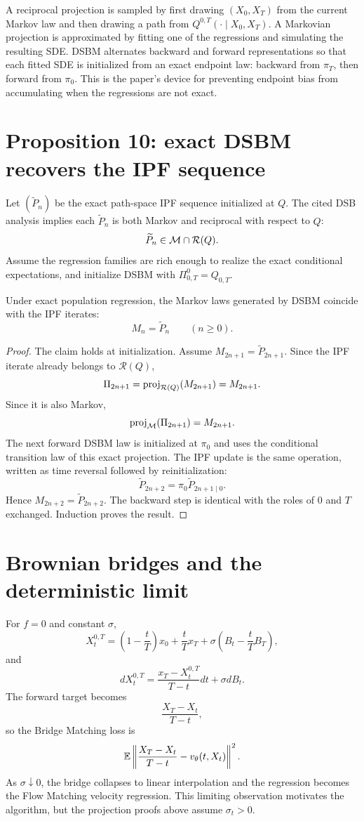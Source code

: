 A reciprocal projection is sampled by first drawing \((X_0,X_T)\) from the current Markov law and then drawing a path from \(Q^{0,T}(\cdot\mid X_0,X_T)\).  A Markovian projection is approximated by fitting one of the regressions and simulating the resulting SDE.  DSBM alternates backward and forward representations so that each fitted SDE is initialized from an exact endpoint law: backward from \(\pi_T\), then forward from \(\pi_0\).  This is the paper's device for preventing endpoint bias from accumulating when the regressions are not exact.

\section{Proposition 10: exact DSBM recovers the IPF sequence}

Let \((\widetilde P_n)\) be the exact path-space IPF sequence initialized at \(Q\).  The cited DSB analysis \cite{DeBortoliThorntonHengDoucet2021} implies each \(\widetilde P_n\) is both Markov and reciprocal with respect to \(Q\):
\[
 \widetilde P_n\in\mathcal{M}\cap\mathcal R(Q).
\]
Assume the regression families are rich enough to realize the exact conditional expectations, and initialize DSBM with \(\Pi^0_{0,T}=Q_{0,T}\).

\begin{proposition}[Proposition 10]
Under exact population regression, the Markov laws generated by DSBM coincide with the IPF iterates:
\[
 M_n=\widetilde P_n
 \qquad(n\ge0).
\]
\end{proposition}

\begin{proof}
The claim holds at initialization.  Assume \(M_{2n+1}=\widetilde P_{2n+1}\).  Since the IPF iterate already belongs to \(\mathcal R(Q)\),
\[
 \Pi_{2n+1}
 =\operatorname{proj}_{\mathcal R(Q)}(M_{2n+1})
 =M_{2n+1}.
\]
Since it is also Markov,
\[
 \operatorname{proj}_{\mathcal{M}}(\Pi_{2n+1})=M_{2n+1}.
\]
The next forward DSBM law is initialized at \(\pi_0\) and uses the conditional transition law of this exact projection.  The IPF update is the same operation, written as time reversal followed by reinitialization:
\[
 \widetilde P_{2n+2}=\pi_0\widetilde P_{2n+1\mid0}.
\]
Hence \(M_{2n+2}=\widetilde P_{2n+2}\).  The backward step is identical with the roles of \(0\) and \(T\) exchanged.  Induction proves the result.
\end{proof}

\section{Brownian bridges and the deterministic limit}
For \(f=0\) and constant \(\sigma\),
\[
 X_t^{0,T}=\left(1-\frac tT\right)x_0+\frac tT x_T
 +\sigma\left(B_t-\frac tTB_T\right),
\]
and
\[
 dX_t^{0,T}=\frac{x_T-X_t^{0,T}}{T-t}dt+\sigma dB_t.
\]
The forward target becomes
\[
 \frac{X_T-X_t}{T-t},
\]
so the Bridge Matching loss is
\[
 \mathbb{E}\left\|\frac{X_T-X_t}{T-t}-v_\theta(t,X_t)\right\|^2.
\]
As \(\sigma\downarrow0\), the bridge collapses to linear interpolation and the regression becomes the Flow Matching velocity regression.  This limiting observation motivates the algorithm, but the projection proofs above assume \(\sigma_t>0\).

